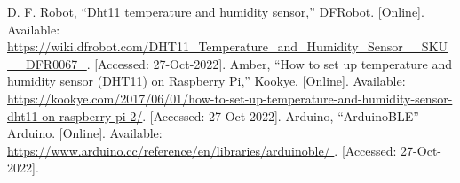 \begin{thebibliography}{00}
     D. F.  Robot, “Dht11 temperature and humidity sensor,” DFRobot. [Online]. Available: \url{https://wiki.dfrobot.com/DHT11_Temperature_and_Humidity_Sensor__SKU__DFR0067_}. [Accessed: 27-Oct-2022]. 
     Amber, “How to set up temperature and humidity sensor (DHT11) on Raspberry Pi,” Kookye. [Online]. Available: \url{https://kookye.com/2017/06/01/how-to-set-up-temperature-and-humidity-sensor-dht11-on-raspberry-pi-2/}. [Accessed: 27-Oct-2022]. 
     Arduino, “ArduinoBLE” Arduino. [Online]. Available: \url{https://www.arduino.cc/reference/en/libraries/arduinoble/ }. [Accessed: 27-Oct-2022]. 
\end{thebibliography}
